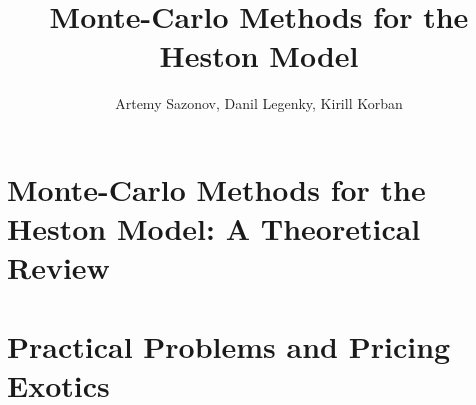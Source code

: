 \documentclass{vegareport}
\title{Monte-Carlo Methods for the Heston Model}
\author{Artemy Sazonov, Danil Legenky, Kirill Korban}
\begin{document}
    \maketitle

    \introduction
        
    
    \part{Monte-Carlo Methods for the Heston Model: A Theoretical Review}
        

    \part{Practical Problems and Pricing Exotics}
        
    
    \conclusion
        

\end{document}
